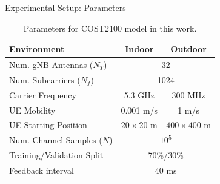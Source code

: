 \documentclass{beamer}
\begin{document}
  \begin{frame}{Experimental Setup: Parameters}
    \begin{table}[htb]
      \begin{center}
        \caption{Parameters for COST2100 model in this work.}
        \label{tab:cost2100-params} 
        \begin{tabular}{|l|c|c|}
          \hline 
          \textbf{Environment}      & \textbf{Indoor}  & \textbf{Outdoor} \\ \hline
          Num. gNB Antennas ($N_T$) & \multicolumn{2}{c|}{32} \\ \hline
          Num. Subcarriers ($N_f$)  & \multicolumn{2}{c|}{1024} \\ \hline
          Carrier Frequency         & 5.3 GHz            & 300 MHz \\ \hline
          UE Mobility               & 0.001 m/s        & 1 m/s \\ \hline
          UE Starting Position      & $20 \times 20$ m & $400 \times 400$ m \\ \hline
          Num. Channel Samples ($N$)& \multicolumn{2}{c|}{$10^5$} \\ \hline
          Training/Validation Split & \multicolumn{2}{c|}{70\%/30\%} \\ \hline
          Feedback interval         & \multicolumn{2}{c|}{$40$ ms} \\ \hline
        \end{tabular}
      \end{center}
    \end{table}
  \end{frame}
\end{document}
